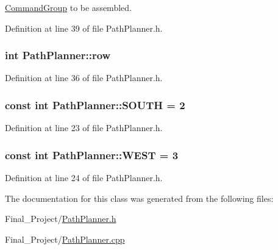 \hyperlink{classCommandGroup}{Command\-Group} to be assembled. 



Definition at line 39 of file Path\-Planner.\-h.

\hypertarget{classPathPlanner_a00b0fa8525a5fe9c8088ccaa005c4c54}{
\subsubsection[{row}]{\setlength{\rightskip}{0pt plus 5cm}int Path\-Planner\-::row\hspace{0.3cm}{\ttfamily [private]}}}\label{classPathPlanner_a00b0fa8525a5fe9c8088ccaa005c4c54}


Definition at line 36 of file Path\-Planner.\-h.

\hypertarget{classPathPlanner_a0d74731cd6e012a8724689f8c8f6492e}{
\subsubsection[{S\-O\-U\-T\-H}]{\setlength{\rightskip}{0pt plus 5cm}const int Path\-Planner\-::\-S\-O\-U\-T\-H = 2\hspace{0.3cm}{\ttfamily [static]}}}\label{classPathPlanner_a0d74731cd6e012a8724689f8c8f6492e}


Definition at line 23 of file Path\-Planner.\-h.

\hypertarget{classPathPlanner_aac8f18908f761050a3801acd476ea0ce}{
\subsubsection[{W\-E\-S\-T}]{\setlength{\rightskip}{0pt plus 5cm}const int Path\-Planner\-::\-W\-E\-S\-T = 3\hspace{0.3cm}{\ttfamily [static]}}}\label{classPathPlanner_aac8f18908f761050a3801acd476ea0ce}


Definition at line 24 of file Path\-Planner.\-h.



The documentation for this class was generated from the following files\-:\begin{DoxyCompactItemize}
\item 
Final\-\_\-\-Project/\hyperlink{PathPlanner_8h}{Path\-Planner.\-h}\item 
Final\-\_\-\-Project/\hyperlink{PathPlanner_8cpp}{Path\-Planner.\-cpp}\end{DoxyCompactItemize}

